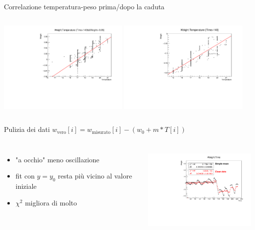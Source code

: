 \documentclass{beamer}
\begin{document}
\begin{frame}{Correlazione temperatura-peso}
  prima/dopo la caduta
  \begin{columns}[c] 
      \includegraphics[height=4.5cm]{../../analisi_dati/171010_long_sd_temp/Weight:Temperature_timed_first}
      \includegraphics[height=4.5cm]{../../analisi_dati/171010_long_sd_temp/Weight:Temperature_timed_second}
  \end{columns}
\end{frame}
\begin{frame}{Pulizia dei dati}
  \(w_{\mathrm{vero}}[i] = w_{\mathrm{misurato}}[i] - (w_0 + m*T[i])\)
  \begin{columns}[c] 
      \begin{itemize}
        \item "a occhio" meno oscillazione
        \item fit con \(y=y_0\) resta pi\`u vicino al valore iniziale
        \item \(\chi^2\) migliora di molto
      \end{itemize}
      \includegraphics[height=4.5cm]{../../analisi_dati/171010_long_sd_temp/Weight_clean_with_T.pdf}
  \end{columns}
\end{frame}
\end{document}
